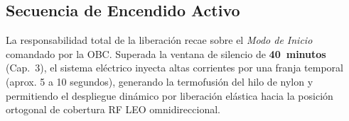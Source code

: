 \subsection{Secuencia de Encendido Activo}
La responsabilidad total de la liberación recae sobre el \textit{Modo de Inicio} comandado por la OBC. Superada la ventana de silencio de \textbf{40~minutos} (Cap.~3), el sistema eléctrico inyecta altas corrientes por una franja temporal (aprox. 5 a 10 segundos), generando la termofusión del hilo de nylon y permitiendo el despliegue dinámico por liberación elástica hacia la posición ortogonal de cobertura RF LEO omnidireccional.
